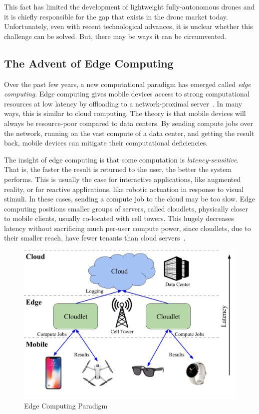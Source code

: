 This fact has limited the development of lightweight fully-autonomous drones and it is chiefly responsible for the gap that exists in the drone market today. Unfortunately, even with recent technological advances, it is unclear whether this challenge can be solved. But, there may be ways it can be circumvented.

\subsection{The Advent of Edge Computing}
Over the past few years, a new computational paradigm has emerged called \textit{edge computing}. Edge computing gives mobile devices access to strong computational resources at low latency by offloading to a network-proximal server~\cite{Satya2017}. In many ways, this is similar to cloud computing. The theory is that mobile devices will always be resource-poor compared to data centers. By sending compute jobs over the network, running on the vast compute of a data center, and getting the result back, mobile devices can mitigate their computational deficiencies. 

The insight of edge computing is that some computation is \textit{latency-sensitive}. That is, the faster the result is returned to the user, the better the system performs. This is usually the case for interactive applications, like augmented reality, or for reactive applications, like robotic actuation in response to visual stimuli. In these cases, sending a compute job to the cloud may be too slow. Edge computing positions smaller groups of servers, called cloudlets, physically closer to mobile clients, usually co-located with cell towers. This hugely decreases latency without sacrificing much per-user compute power, since cloudlets, due to their smaller reach, have fewer tenants than cloud servers~\cite{Charyyev2020,Dolui2017}.

\begin{figure}
    \centering
    \includegraphics[width=0.9\linewidth]{chapter2/FIGS/edge-computing.jpg}
    \caption{Edge Computing Paradigm}
    \label{fig:edge-computing}
\end{figure}

